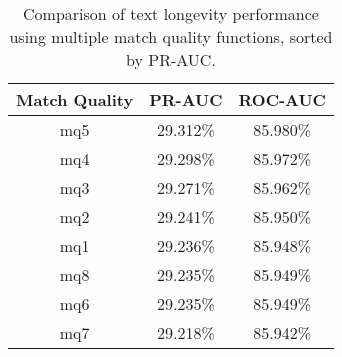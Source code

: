 \begin{table}[tbph]
\begin{center}
\begin{tabular}{|c||c|c|}
\hline
Match Quality & PR-AUC & ROC-AUC \\
\hline
\hline
mq5 & 29.312\% & 85.980\% \\
mq4 & 29.298\% & 85.972\% \\
mq3 & 29.271\% & 85.962\% \\
mq2 & 29.241\% & 85.950\% \\
mq1 & 29.236\% & 85.948\% \\
mq8 & 29.235\% & 85.949\% \\
mq6 & 29.235\% & 85.949\% \\
mq7 & 29.218\% & 85.942\% \\
\hline
\end{tabular}
\end{center}
\caption{Comparison of text longevity performance using
    multiple match quality functions, sorted by PR-AUC.}
\label{tab:textshoutA}
\end{table}
